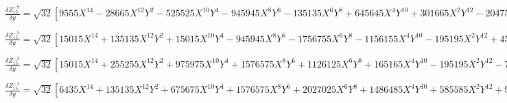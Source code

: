 \documentclass[10pt,landscape]{article}
\begin{document}
\vspace{1.2 mm}
\noindent $ \frac{\delta Z^{-7}_{15}}{\delta y} = \sqrt{32} [9555X^{14} -28665X^{12}Y^{2} -525525X^{10}Y^{4} -945945X^{8}Y^{6} -135135X^{6}Y^{8} +645645X^{4}Y^{10} +301665X^{2}Y^{12} -20475Y^{14} -28028X^{12} +168168X^{10}Y^{2} +1261260X^{8}Y^{4} +1009008X^{6}Y^{6} -900900X^{4}Y^{8} -792792X^{2}Y^{10} +52052Y^{12} +30030X^{10} -270270X^{8}Y^{2} -900900X^{6}Y^{4} +180180X^{4}Y^{6} +733590X^{2}Y^{8} -47190Y^{10} -13860X^{8} +166320X^{6}Y^{2} +138600X^{4}Y^{4} -277200X^{2}Y^{6} +17820Y^{8} +2310X^{6} -34650X^{4}Y^{2} +34650X^{2}Y^{4} -2310Y^{6}] $

\vspace{1.2 mm}
\noindent $ \frac{\delta Z^{-5}_{15}}{\delta y} = \sqrt{32} [15015X^{14} +135135X^{12}Y^{2} +15015X^{10}Y^{4} -945945X^{8}Y^{6} -1756755X^{6}Y^{8} -1156155X^{4}Y^{10} -195195X^{2}Y^{12} +45045Y^{14} -50050X^{12} -300300X^{10}Y^{2} +450450X^{8}Y^{4} +2522520X^{6}Y^{6} +2612610X^{4}Y^{8} +660660X^{2}Y^{10} -130130Y^{12} +64350X^{10} +193050X^{8}Y^{2} -900900X^{6}Y^{4} -1981980X^{4}Y^{6} -810810X^{2}Y^{8} +141570Y^{10} -39600X^{8} +554400X^{4}Y^{4} +443520X^{2}Y^{6} -71280Y^{8} +11550X^{6} -34650X^{4}Y^{2} -103950X^{2}Y^{4} +16170Y^{6} -1260X^{4} +7560X^{2}Y^{2} -1260Y^{4}] $

\vspace{1.2 mm}
\noindent $ \frac{\delta Z^{-3}_{15}}{\delta y} = \sqrt{32} [15015X^{14} +255255X^{12}Y^{2} +975975X^{10}Y^{4} +1576575X^{8}Y^{6} +1126125X^{6}Y^{8} +165165X^{4}Y^{10} -195195X^{2}Y^{12} -75075Y^{14} -54054X^{12} -756756X^{10}Y^{2} -2252250X^{8}Y^{4} -2522520X^{6}Y^{6} -810810X^{4}Y^{8} +396396X^{2}Y^{10} +234234Y^{12} +77220X^{10} +849420X^{8}Y^{2} +1801800X^{6}Y^{4} +1081080X^{4}Y^{6} -231660X^{2}Y^{8} -283140Y^{10} -55440X^{8} -443520X^{6}Y^{2} -554400X^{4}Y^{4} +166320Y^{8} +20790X^{6} +103950X^{4}Y^{2} +34650X^{2}Y^{4} -48510Y^{6} -3780X^{4} -7560X^{2}Y^{2} +6300Y^{4} +252X^{2} -252Y^{2}] $

\vspace{1.2 mm}
\noindent $ \frac{\delta Z^{-1}_{15}}{\delta y} = \sqrt{32} [6435X^{14} +135135X^{12}Y^{2} +675675X^{10}Y^{4} +1576575X^{8}Y^{6} +2027025X^{6}Y^{8} +1486485X^{4}Y^{10} +585585X^{2}Y^{12} +96525Y^{14} -24024X^{12} -432432X^{10}Y^{2} -1801800X^{8}Y^{4} -3363360X^{6}Y^{6} -3243240X^{4}Y^{8} -1585584X^{2}Y^{10} -312312Y^{12} +36036X^{10} +540540X^{8}Y^{2} +1801800X^{6}Y^{4} +2522520X^{4}Y^{6} +1621620X^{2}Y^{8} +396396Y^{10} -27720X^{8} -332640X^{6}Y^{2} -831600X^{4}Y^{4} -776160X^{2}Y^{6} -249480Y^{8} +11550X^{6} +103950X^{4}Y^{2} +173250X^{2}Y^{4} +80850Y^{6} -2520X^{4} -15120X^{2}Y^{2} -12600Y^{4} +252X^{2} +756Y^{2} -8] $
\end{document}
